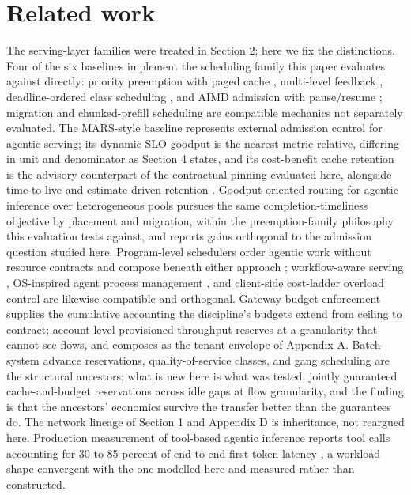 \section{Related work}

The serving-layer families were treated in Section 2; here we fix the
distinctions. Four of the six baselines implement the scheduling family
this paper evaluates against directly: priority preemption with paged
cache \citep{vllm2023}, multi-level feedback \citep{wu2023fastserve},
deadline-ordered class scheduling \citep{niyama2025}, and AIMD admission with
pause/resume \citep{concur2026}; migration and chunked-prefill scheduling
\citep{llumnix2024,sarathi2024} are compatible mechanics not separately
evaluated. The MARS-style baseline \citep{mars2026} represents external
admission control for agentic serving; its dynamic SLO goodput is the
nearest metric relative, differing in unit and denominator as Section 4
states, and its cost-benefit cache retention is the advisory counterpart
of the contractual pinning evaluated here, alongside time-to-live and
estimate-driven retention \citep{continuum2025,infercept2024}.
Goodput-oriented routing for agentic inference over heterogeneous pools
\citep{goodserve2026} pursues the same completion-timeliness objective by
placement and migration, within the preemption-family philosophy this
evaluation tests against, and reports gains orthogonal to the admission
question studied here. Program-level schedulers order agentic work
without resource contracts and compose beneath either approach
\citep{autellix2025}; workflow-aware serving \citep{helium2026}, OS-inspired agent
process management \citep{hivemind2026}, and client-side cost-ladder overload
control \citep{unschedulable2026} are likewise compatible and orthogonal.
Gateway budget enforcement \citep{litellm2026,truefoundry2026} supplies the
cumulative accounting the discipline's budgets extend from ceiling to
contract; account-level provisioned throughput \citep{bedrock_ptu,azure_ptu}
reserves at a granularity that cannot see flows, and composes as the
tenant envelope of Appendix A. Batch-system advance reservations,
quality-of-service classes, and gang scheduling \citep{slurm_reservations,k8s_qos,gang_scheduling} are the structural ancestors; what is new here
is what was tested, jointly guaranteed cache-and-budget reservations
across idle gaps at flow granularity, and the finding is that the
ancestors' economics survive the transfer better than the guarantees do.
The network lineage of Section 1 and Appendix D \citep{rfc2205,rfc2475,floyd1993red,rfc2597,rfc2827,rfc3704,ipmi_spec} is inheritance, not
reargued here. Production measurement of tool-based agentic inference
reports tool calls accounting for 30 to 85 percent of end-to-end
first-token latency \citep{sutradhara2026}, a workload shape convergent with
the one modelled here and measured rather than constructed.

